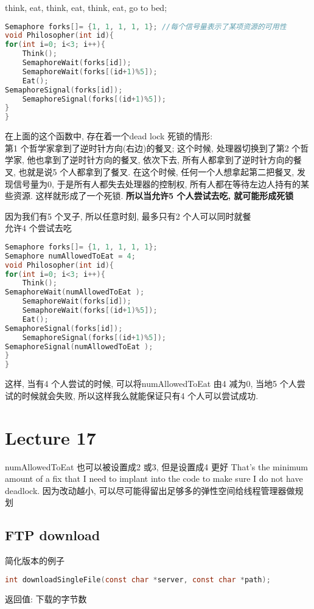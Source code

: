 \documentclass{article}
\begin{document}
think, eat, think, eat, think, eat, go to bed;
\begin{lstlisting}[language = C]
Semaphore forks[]= {1, 1, 1, 1, 1}; //每个信号量表示了某项资源的可用性
void Philosopher(int id){
for(int i=0; i<3; i++){
	Think();
	SemaphoreWait(forks[id]);
	SemaphoreWait(forks[(id+1)%5]);
	Eat();
SemaphoreSignal(forks[id]);
	SemaphoreSignal(forks[(id+1)%5]);
}
}
\end{lstlisting}
在上面的这个函数中, 存在着一个dead lock 死锁的情形:\\
第1 个哲学家拿到了逆时针方向(右边)的餐叉; 这个时候, 处理器切换到了第2 个哲学家, 他也拿到了逆时针方向的餐叉, 依次下去, 所有人都拿到了逆时针方向的餐叉, 也就是说5 个人都拿到了餐叉. 在这个时候, 任何一个人想拿起第二把餐叉, 发现信号量为0, 于是所有人都失去处理器的控制权, 所有人都在等待左边人持有的某些资源. 这样就形成了一个死锁.
\textbf{所以当允许5 个人尝试去吃, 就可能形成死锁}

因为我们有5 个叉子, 所以任意时刻, 最多只有2 个人可以同时就餐\\
允许4 个尝试去吃
\begin{lstlisting}[language = C]
Semaphore forks[]= {1, 1, 1, 1, 1};
Semaphore numAllowedToEat = 4;
void Philosopher(int id){
for(int i=0; i<3; i++){
	Think();
SemaphoreWait(numAllowedToEat );
	SemaphoreWait(forks[id]);
	SemaphoreWait(forks[(id+1)%5]);
	Eat();
SemaphoreSignal(forks[id]);
	SemaphoreSignal(forks[(id+1)%5]);
SemaphoreSignal(numAllowedToEat );
}
}
\end{lstlisting}
这样, 当有4 个人尝试的时候, 可以将numAllowedToEat 由4 减为0, 当地5 个人尝试的时候就会失败, 所以这样我么就能保证只有4 个人可以尝试成功.

\section{Lecture 17}
numAllowedToEat 也可以被设置成2 或3, 但是设置成4 更好
That's the minimum amount of a fix that I need to implant into the code to make sure I do not have deadlock.
因为改动越小, 可以尽可能得留出足够多的弹性空间给线程管理器做规划

\subsection{FTP download}
简化版本的例子
\begin{lstlisting}[language = C]
int downloadSingleFile(const char *server, const char *path);
\end{lstlisting}
返回值: 下载的字节数
\end{document}
